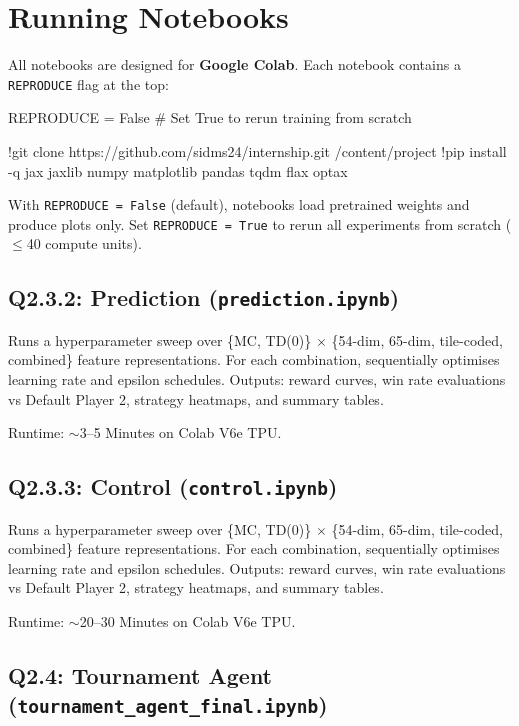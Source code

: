 \documentclass[11pt]{article}
\begin{document}
\section{Running Notebooks}

\noindent All notebooks are designed for \textbf{Google Colab}. Each notebook contains a \texttt{REPRODUCE} flag at the top:

\begin{codecell}[{[1]}]
REPRODUCE = False  # Set True to rerun training from scratch

!git clone https://github.com/sidms24/internship.git /content/project
!pip install -q jax jaxlib numpy matplotlib pandas tqdm flax optax
\end{codecell}

\noindent With \texttt{REPRODUCE = False} (default), notebooks load pretrained weights and produce plots only. Set \texttt{REPRODUCE = True} to rerun all experiments from scratch ($\leq$40 compute units).


\subsection{Q2.3.2: Prediction (\texttt{prediction.ipynb})}

Runs a hyperparameter sweep over \{MC, TD(0)\} $\times$ \{54-dim, 65-dim, tile-coded, combined\} feature representations. For each combination, sequentially optimises learning rate and epsilon schedules. Outputs: reward curves, win rate evaluations vs Default Player 2, strategy heatmaps, and summary tables.

\noindent Runtime: $\sim$3--5 Minutes on Colab V6e TPU. 

\subsection{Q2.3.3: Control (\texttt{control.ipynb})}

\noindent Runs a hyperparameter sweep over \{MC, TD(0)\} $\times$ \{54-dim, 65-dim, tile-coded, combined\} feature representations. For each combination, sequentially optimises learning rate and epsilon schedules. Outputs: reward curves, win rate evaluations vs Default Player 2, strategy heatmaps, and summary tables.

\noindent Runtime: $\sim$20--30 Minutes on Colab V6e TPU. 


\subsection{Q2.4: Tournament Agent (\texttt{tournament\_agent\_final.ipynb})}
\end{document}
